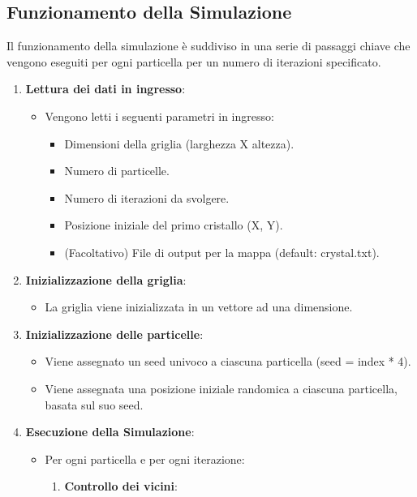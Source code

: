 \documentclass{article}
\begin{document}
\subsection{Funzionamento della Simulazione}
Il funzionamento della simulazione è suddiviso in una serie di passaggi chiave che vengono eseguiti per ogni particella per un numero di iterazioni specificato.
\begin{enumerate}
    \item \textbf{Lettura dei dati in ingresso}:
    \begin{itemize}
        \item Vengono letti i seguenti parametri in ingresso:
        \begin{itemize}
            \item Dimensioni della griglia (larghezza X altezza).
            \item Numero di particelle.
            \item Numero di iterazioni da svolgere.
            \item Posizione iniziale del primo cristallo (X, Y).
            \item (Facoltativo) File di output per la mappa (default: crystal.txt).
        \end{itemize}
    \end{itemize}
    \item \textbf{Inizializzazione della griglia}:
    \begin{itemize}
        \item La griglia viene inizializzata in un vettore ad una dimensione.
    \end{itemize}
    \item \textbf{Inizializzazione delle particelle}:
    \begin{itemize}
        \item Viene assegnato un seed univoco a ciascuna particella (seed = index * 4).
        \item Viene assegnata una posizione iniziale randomica a ciascuna particella, basata sul suo seed.
    \end{itemize}
    \item \textbf{Esecuzione della Simulazione}:
    \begin{itemize}
        \item Per ogni particella e per ogni iterazione:
            \begin{enumerate}
                \item \textbf{Controllo dei vicini}:
                    \begin{itemize}

\end{itemize}
\end{enumerate}
\end{itemize}
\end{enumerate}
\end{document}
